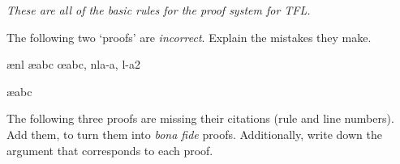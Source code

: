 \emph{These are all of the basic rules for the proof system for TFL.}

\practiceproblems

\problempart
The following two `proofs' are \emph{incorrect}. Explain the mistakes they make.
\begin{fitchproof}
\PR
\open
{}\AS
{}\ae{nl}
	\ae{abc}
\close
\open
	\AS
\close
{}\oe{abc, nla-a, l-a2}
\end{fitchproof}

\begin{fitchproof}
\PR
{}\PR
{}\ae{abc}
\end{fitchproof}

\problempart
The following three proofs are missing their citations (rule and line numbers). Add them, to turn them into \emph{bona fide} proofs. Additionally, write down the argument that corresponds to each proof.
\begin{multicols}{2}
\begin{fitchproof}
\end{fitchproof}

\begin{fitchproof}
\open
\close
{}%
\end{fitchproof}

\begin{fitchproof}
\open
\close
\open
\close
{}%
\end{fitchproof}
\end{multicols}

